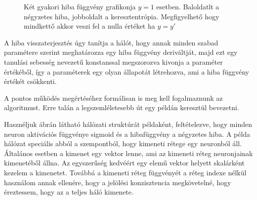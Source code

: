 \begin{figure}[H]
		\begin{subfigure}{\linewidth}
		\end{subfigure}
	\caption{Két gyakori hiba függvény grafikonja $y=1$ esetben. Baloldatlt a négyzetes hiba, jobboldalt a keresztentrópia. Megfigyelhető hogy mindkettő akkor veszi fel a nulla értéket ha $y = y'$ \label{loss}}
	\end{figure}
	
A hiba visszaterjesztés úgy tanítja a hálót, hogy annak minden szabad paramétere szerint meghatározza egy hiba függvény deriváltját, majd ezt egy tanulási sebesség nevezetű konstanssal megszorozva kivonja a paraméter értékéből, így a paraméterek egy olyan állapotát létrehozva, ami a hiba függvény értékét csökkenti.

A pontos működés megértéséhez formálisan is meg kell fogalmaznunk az algoritmust. Erre talán a legszemléletesebb út egy példán keresztül bevezetni.

Hasznéljuk  ábrán látható hálózati struktúrát példaként, feltételezve, hogy minden neuron aktivációs függvénye sigmoid és a hibafüggvény a négyzetes hiba.
A példa hálózat speciális abból a szempontból, hogy kimeneti rétege egy neuronból áll. Általános esetben a kimenet egy vektor lenne, ami az kimeneti réteg neuronjainak kimenetéből állna.  Az egyszerűség kedvéért egy elemű vektor helyett skalárként kezelem a kimenetet. Továbbá a kimeneti réteg függvényét a réteg indexe nélkül használom annak ellenére, hogy a jelölési konzisztencia megkövetelné, hogy éreztessem, hogy az a teljes háló kimenete.


